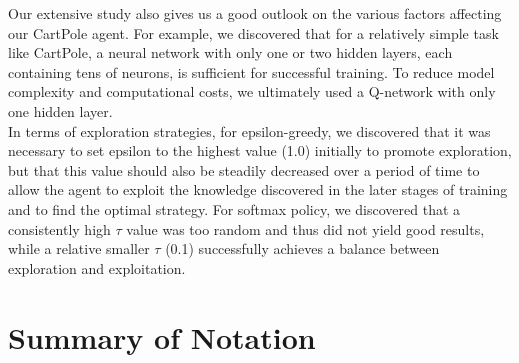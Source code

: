 \documentclass{article}
\begin{document}
Our extensive study also gives us a good outlook on the various factors affecting our CartPole agent. For example, we discovered that for a relatively simple task like CartPole, a neural network with only one or two hidden layers, each containing tens of neurons, is sufficient for successful training. To reduce model complexity and computational costs, we ultimately used a Q-network with only one hidden layer.\\
In terms of exploration strategies, for epsilon-greedy, we discovered that it was necessary to set epsilon to the highest value (1.0) initially to promote exploration, but that this value should also be steadily decreased over a period of time to allow the agent to exploit the knowledge discovered in the later stages of training and to find the optimal strategy. For softmax policy, we discovered that a consistently high $\tau$ value was too random and thus did not yield good results, while a relative smaller $\tau$ (0.1) successfully achieves a balance between exploration and exploitation.\\






\nocite{langley00}












\section*{Summary of Notation}
\end{document}
